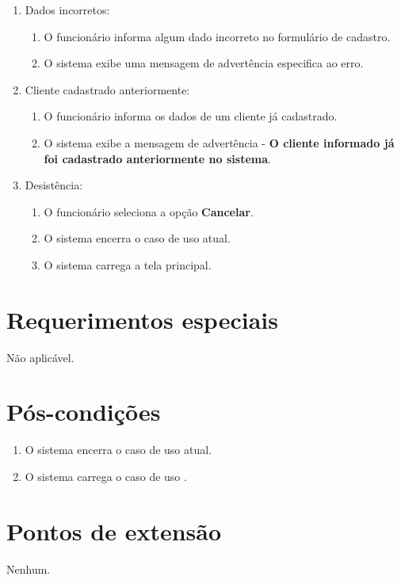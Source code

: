 \begin{enumerate}
	\item Dados incorretos:
	\begin{enumerate}
		\item O funcionário informa algum dado incorreto no formulário de cadastro. 
		\item O sistema exibe uma mensagem de advertência especifica ao erro.
	\end{enumerate}
	\item Cliente cadastrado anteriormente:
	\begin{enumerate}
		\item O funcionário informa os dados de um cliente já cadastrado. 
		\item O sistema exibe a mensagem de advertência - \textbf{O cliente informado já foi cadastrado anteriormente no sistema}.
	\end{enumerate}	
	\item Desistência:
	\begin{enumerate}
		\item O funcionário seleciona a opção \textbf{Cancelar}.
		\item O sistema encerra o caso de uso atual.
		\item O sistema carrega a tela principal.
	\end{enumerate}
\end{enumerate}

\section{Requerimentos especiais}

Não aplicável.

\section{Pós-condições}

\begin{enumerate}
	\item O sistema encerra o caso de uso atual.
	\item O sistema carrega o caso de uso .
\end{enumerate}

\section{Pontos de extensão}

Nenhum.